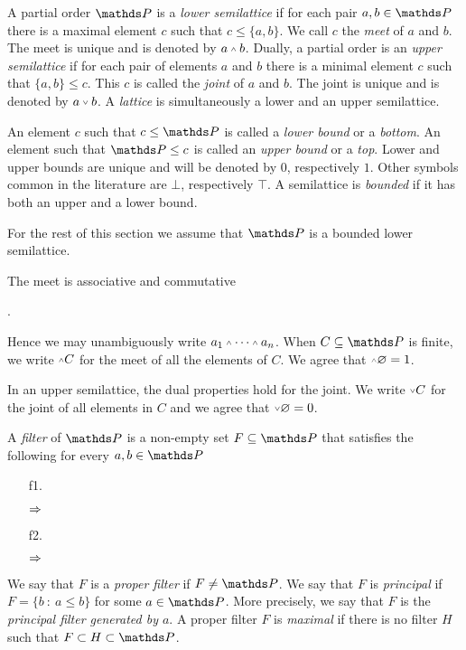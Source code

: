 \documentclass[creche.tex]{subfiles}
\begin{document}
A partial order $\PP$ is a \emph{lower semilattice\/} if for each pair $a,b\in\PP$ there is a maximal element $c$ such that $c\le\{a,b\}$. We call $c$ the \emph{meet\/} of $a$ and $b$. The meet is unique and is denoted by \emph{$a\swedge b$}. Dually, a partial order is an \emph{upper semilattice\/} if for each pair of elements $a$ and $b$ there is a minimal element $c$ such that $\{a,b\}\le c$. This $c$ is called the \emph{joint\/} of $a$ and $b$. The joint is unique and is denoted by \emph{$a\svee b$}. A \emph{lattice\/} is simultaneously a lower and an upper semilattice.

An element $c$ such that $c\le \PP$ is called a \emph{lower bound\/} or a \emph{bottom}. An element such that $\PP\le c$ is called an \emph{upper bound\/} or a \emph{top}. Lower and upper bounds are unique and will be denoted by \emph{$0$}, respectively \emph{$1$}. Other symbols common in the literature are \emph{$\bot$}, respectively \emph{$\top$}. A semilattice is \emph{bounded\/} if it has both an upper and a lower bound. 

For the rest of this section we assume that $\PP$ is a bounded lower semilattice.

The meet is associative and commutative


.

Hence we may unambiguously write  $a_1\swedge\dots\swedge a_n$. When $C\subseteq\PP$ is finite, we write \emph{$\swedge C$} for the meet of all the elements of $C$. We agree that $\swedge\0=1$.

In an upper semilattice, the dual properties hold for the joint. We write \emph{$\svee C$} for the joint of all elements in $C$ and we agree that  $\svee\0=0$.

A \emph{filter\/} of $\PP$ is a non-empty set $F\subseteq \PP$ that satisfies the following for every $a,b\in \PP$
\begin{itemize}
\def\ceq#1#2#3{\hspace*{16ex}\llap{$#1$}\parbox{5ex}{\hfil$#2$}\rlap{$#3$}}
\item[f1.] \ceq{a\in F\ \textrm{ and }\ a\le b}{\IMP}{b\in F}
\item[f2.] \ceq{a, b\in F}{\IMP}{a\swedge  b\in F.}
\end{itemize}
We say that $F$ is a \emph{proper filter\/} if $F\neq \PP$. We say that $F$ is \emph{principal\/} if $F=\big\{b\ :\ a\le b\big\}$ for some $a\in \PP$. More precisely, we say that $F$ is the \emph{principal filter generated by $a$}. A proper filter $F$ is \emph{maximal\/} if there is no filter $H$ such that $F\subset H\subset \PP$. 
\end{document}
